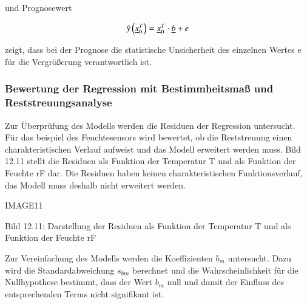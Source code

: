 \noindent und Prognosewert

\begin{equation}\label{eq:thirteeneightythree}
\hat{y}\left(\underline{x}_{0}^{T} \right)=\underline{x}_{0}^{T} \cdot \underline{b} +e
\end{equation}

\noindent zeigt, dass bei der Prognose die statistische Unsicherheit des einzelnen Wertes e f\"{u}r die Vergr\"{o}{\ss}erung verantwortlich ist.

\clearpage

\subsubsection{Bewertung der Regression mit Bestimmheitsma{\ss} und Reststreuungsanalyse}

\noindent Zur \"{U}berpr\"{u}fung des Modells werden die Residuen der Regression untersucht. F\"{u}r das beispiel des Feuchtesensors wird bewertet, ob die Reststreuung einen charakteristischen Verlauf aufweist und das Modell erweitert werden muss. Bild 12.11 stellt die Residuen als Funktion der Temperatur T und als Funktion der Feuchte rF dar. Die Residuen haben keinen charakteristischen Funktionsverlauf, das Modell muss deshalb nicht erweitert werden.

IMAGE11

\noindent Bild 12.11: Darstellung der Residuen als Funktion der Temperatur T und als Funktion der Feuchte rF

\noindent Zur Vereinfachung des Modells werden die Koeffizienten $b_{m}$ untersucht. Dazu wird die Standardabweichung $s_{bm}$ berechnet und die Wahrscheinlichkeit f\"{u}r die Nullhypothese bestimmt, dass der Wert $b_{m}$ null und damit der Einfluss des entsprechenden Terms nicht signifikant ist.

